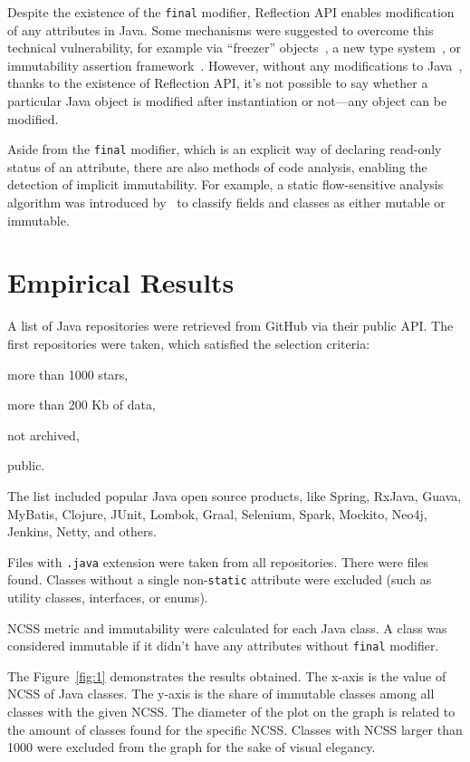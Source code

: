 \documentclass[12pt]{article}
\begin{document}
Despite the existence of the \texttt{final} modifier, Reflection API enables
modification of any attributes in Java. Some mechanisms were suggested to
overcome this technical vulnerability, for example
via ``freezer'' objects~\cite{leino2008},
a new type system~\cite{tschantz2005},
or immutability assertion framework~\cite{pechtchanski2005}.
However, without any modifications to Java~\cite{steele2005},
thanks to the existence of Reflection API,
it's not possible to say whether a particular Java object is modified
after instantiation or not---any object can be modified.

Aside from the \texttt{final} modifier, which is an explicit way of declaring
read-only status of an attribute, there are also methods of
code analysis, enabling the detection of implicit immutability. For example,
a static flow-sensitive analysis algorithm was introduced by~\cite{porat2000}
to classify fields and classes as either mutable or immutable.

\section{Empirical Results}

A list of Java repositories were retrieved from GitHub via their
public API. The first \totalrepos{} repositories were taken, which satisfied
the selection criteria:
\begin{enumerate*}[label={\arabic*)}]
\item more than 1000 stars,
\item more than 200 Kb of data,
\item not archived,
\item public.
\end{enumerate*}
The list included popular Java open source products, like
Spring, RxJava, Guava, MyBatis, Clojure, JUnit, Lombok,
Graal, Selenium, Spark, Mockito, Neo4j, Jenkins, Netty, and others.

Files with \texttt{.java} extension were taken from all repositories.
There were \totaljavafiles{} files found. Classes without a single
non-\texttt{static} attribute were excluded (such as utility classes,
interfaces, or enums).

NCSS metric and immutability were calculated for each Java class.
A class was considered immutable if it didn't have any
attributes without \texttt{final} modifier.

The Figure~\ref{fig:1} demonstrates the results obtained. The x-axis is
the value of NCSS of Java classes. The y-axis is the share of immutable classes among
all classes with the given NCSS. The diameter of the plot on the graph
is related to the amount of classes found for the specific NCSS. Classes
with NCSS larger than 1000 were excluded from the graph for the sake of
visual elegancy.
\end{document}
